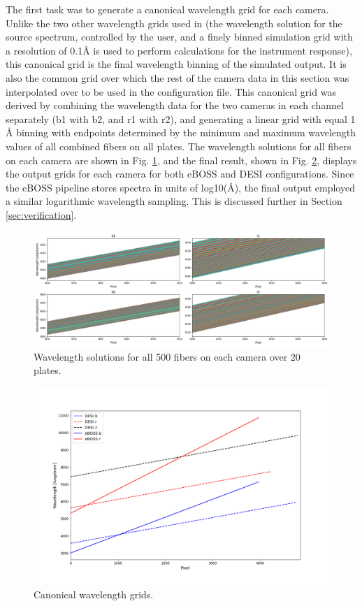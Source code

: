 The first task was to generate a canonical wavelength grid for each camera. Unlike the two other wavelength grids used in  (the wavelength solution for the source spectrum, controlled by the user, and a finely binned simulation grid with a resolution of 0.1$\mbox{\AA}$ is used to perform calculations for the instrument response), this canonical grid is the final wavelength binning of the simulated output. It is also the common grid over which the rest of the camera data in this section was interpolated over to be used in the configuration file. This canonical grid was derived by combining the wavelength data for the two cameras in each channel separately (b1 with b2, and r1 with r2), and generating a linear grid with equal 1$\mbox{\AA}$ binning with endpoints determined by the minimum and maximum wavelength values of all combined fibers on all plates. The wavelength solutions for all fibers on each camera are shown in Fig. \ref{fig:wavelength_solutions}, and the final result, shown in Fig. \ref{fig:canonical}, displays the output grids for each camera for both eBOSS and DESI configurations. Since the eBOSS pipeline stores spectra in units of log10($\mbox{\AA}$), the final output employed a similar logarithmic wavelength sampling. This is discussed further in Section \ref{sec:verification}.\\

\begin{figure}[h]
\centering
\includegraphics[width=16cm]{images/specsim/wlen_soln.png}
\caption{Wavelength solutions for all 500 fibers on each camera over 20 plates.}
\label{fig:wavelength_solutions}
\end{figure}


\begin{figure}[h]
\centering
\includegraphics[width=14cm]{images/specsim/canonical_grid.png}
\caption{Canonical wavelength grids.}
\label{fig:canonical}
\end{figure}

